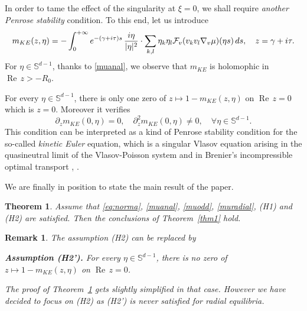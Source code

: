 \documentclass[11pt]{amsart}
\numberwithin{equation}{section}
\newcommand{\na}{\nabla}
\newtheorem{thm}{Theorem}[section]
\newtheorem{rem}{Remark}[section]
\begin{document}
\medskip


In order to tame the effect of the singularity at $\xi=0$, we shall require \emph{another Penrose stability} condition.
To this end, let us introduce 
$$ m_{KE}(z, \eta)=  -   \int_{0}^{+ \infty} e^{-(\gamma + i \tau)s}\, {i \eta \over  |\eta|^2}\cdot   \sum_{k,l} \eta_k \eta_l \mathcal{F}_v( v_k v_l \na_v \mu)(\eta s) \, d s, \quad z = \gamma + i \tau.$$
 For $\eta \in  \mathbb{S}^{d-1}$, thanks to \eqref{muanal}, we observe that $m_{KE}$ is holomophic in ${\operatorname{Re}}\, z >- R_{0}$.
  
  For every $\eta \in  \mathbb{S}^{d-1}$, there is only one zero of  $ z \mapsto 1 -  m_{KE}(z, \eta)$  on  $ {\operatorname{Re}}\, z =  0$
   which is $z= 0$. Moreover it verifies
  \begin{equation}
  \label{penrose3}
   \partial_{z} m_{KE}(0, \eta)= 0, \quad   \partial_{z}^2 m_{KE}(0, \eta)\neq 0,  \quad \forall \eta \in \mathbb{S}^{d-1}.
   \end{equation}  
This condition can be interpreted as a kind of Penrose stability condition for the so-called \emph{kinetic Euler} equation, which is a singular Vlasov equation arising in the quasineutral limit of the Vlasov-Poisson system and in Brenier's  incompressible optimal transport \cite{Br89}, \cite{BrCPAM}.

We are finally in position to state the main result of the paper.
\begin{thm}
\label{thm2}
Assume that  \eqref{eq:norma}, \eqref{muanal}, \eqref{muodd}, \eqref{muradial}, (H1) and (H2) are satisfied.
Then the conclusions of Theorem~\ref{thm1} hold.
\end{thm}

\begin{rem}The assumption (H2) can be replaced by

{\bf Assumption (H2').}  For every $\eta \in  \mathbb{S}^{d-1}$, there is no zero of  $ z \mapsto 1 -  m_{KE}(z, \eta)$  on  $ {\operatorname{Re}}\, z =  0$.

The proof of Theorem~\ref{thm2} gets slightly simplified in that case. However we have decided to focus on (H2) as (H2') is never satisfied for radial equilibria.
\end{rem}
\end{document}
